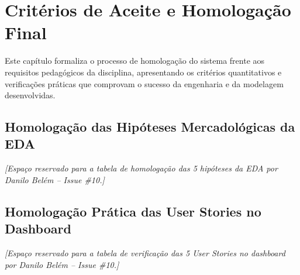 % 

\section{Critérios de Aceite e Homologação Final}
\label{sec:criterios_aceite}

Este capítulo formaliza o processo de homologação do sistema frente aos requisitos pedagógicos da disciplina, apresentando os critérios quantitativos e verificações práticas que comprovam o sucesso da engenharia e da modelagem desenvolvidas.

\subsection{Homologação das Hipóteses Mercadológicas da EDA}
\label{sec:homologacao_hipoteses}

\noindent\textit{[Espaço reservado para a tabela de homologação das 5 hipóteses da EDA por Danilo Belém -- Issue \#10.]}

\subsection{Homologação Prática das User Stories no Dashboard}
\label{sec:homologacao_us}

\noindent\textit{[Espaço reservado para a tabela de verificação das 5 User Stories no dashboard por Danilo Belém -- Issue \#10.]}

